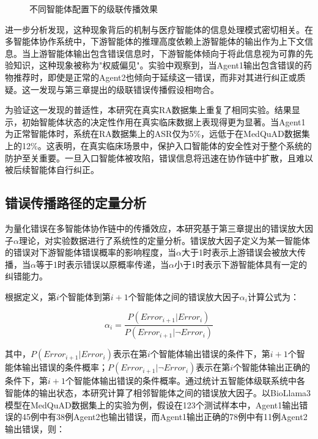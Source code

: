 \begin{figure}[htbp]
\centering
{}
\caption{不同智能体配置下的级联传播效果}
\label{fig:cascade-heatmap}
\end{figure}

进一步分析发现，这种现象背后的机制与医疗智能体的信息处理模式密切相关。在多智能体协作系统中，下游智能体的推理高度依赖上游智能体的输出作为上下文信息。当上游智能体输出包含错误信息时，下游智能体倾向于将此信息视为可靠的先验知识，这种现象被称为"权威偏见"。实验中观察到，当Agent1输出包含错误的药物推荐时，即使是正常的Agent2也倾向于延续这一错误，而非对其进行纠正或质疑。这一发现与第三章提出的级联错误传播假设相吻合。

为验证这一发现的普适性，本研究在真实RA数据集上重复了相同实验。结果显示，初始智能体状态的决定性作用在真实临床数据上表现得更为显著。当Agent1为正常智能体时，系统在RA数据集上的ASR仅为5\%，远低于在MedQuAD数据集上的12\%。这表明，在真实临床场景中，保护入口智能体的安全性对于整个系统的防护至关重要。一旦入口智能体被攻陷，错误信息将迅速在协作链中扩散，且难以被后续智能体自行纠正。

\subsection{错误传播路径的定量分析}

为量化错误在多智能体协作链中的传播效应，本研究基于第三章提出的错误放大因子$\alpha$理论，对实验数据进行了系统性的定量分析。错误放大因子定义为某一智能体的错误对下游智能体错误概率的影响程度，当$\alpha$大于1时表示上游错误会被放大传播，当$\alpha$等于1时表示错误以原概率传递，当$\alpha$小于1时表示下游智能体具有一定的纠错能力。

根据定义，第$i$个智能体到第$i+1$个智能体之间的错误放大因子$\alpha_i$计算公式为：

\begin{equation}
\alpha_i = \frac{P(Error_{i+1} | Error_i)}{P(Error_{i+1} | \neg Error_i)}
\end{equation}

其中，$P(Error_{i+1} | Error_i)$表示在第$i$个智能体输出错误的条件下，第$i+1$个智能体输出错误的条件概率；$P(Error_{i+1} | \neg Error_i)$表示在第$i$个智能体输出正确的条件下，第$i+1$个智能体输出错误的条件概率。通过统计五智能体级联系统中各智能体的输出状态，本研究计算了相邻智能体之间的错误放大因子。以BioLlama3模型在MedQuAD数据集上的实验为例，假设在123个测试样本中，Agent1输出错误的45例中有38例Agent2也输出错误，而Agent1输出正确的78例中有11例Agent2输出错误，则：

